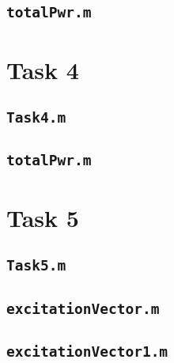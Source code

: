 \subsection{\texttt{totalPwr.m}}



\section{Task 4}
\label{section:task4.m}

\subsection{\texttt{Task4.m}}



\subsection{\texttt{totalPwr.m}}



\section{Task 5}
\label{section:task5.m}

\subsection{\texttt{Task5.m}}



\subsection{\texttt{excitationVector.m}}


\subsection{\texttt{excitationVector1.m}}






